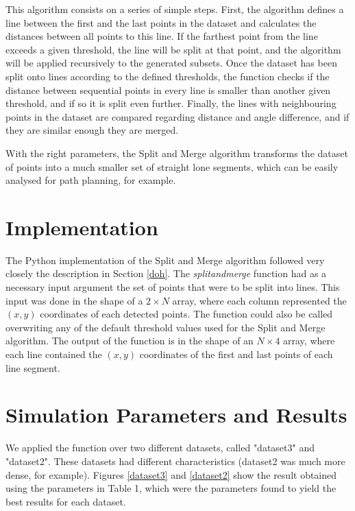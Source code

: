 \documentclass[11pt,oneside,a4paper]{article}
\begin{document}
This algorithm consists on a series of simple steps. First, the algorithm defines a line between the first and the last points in the dataset and calculates the distances between all points to this line. If the farthest point from the line exceeds a given threshold, the line will be split at that point, and the algorithm will be applied recursively to the generated subsets. Once the dataset has been split onto lines according to the defined thresholds, the function checks if the distance between sequential points in every line is smaller than another given threshold, and if so it is split even further. Finally, the lines with neighbouring points in the dataset are compared regarding distance and angle difference, and if they are similar enough they are merged.

With the right parameters, the Split and Merge algorithm transforms the dataset of points into a much smaller set of straight lone segments, which can be easily analysed for path planning, for example.

\section{Implementation}

The Python implementation of the Split and Merge algorithm followed very closely the description in Section \ref{doh}. The \textit{splitandmerge} function had as a necessary input argument the set of points that were to be split into lines. This input was done in the shape of a $2\times N$ array, where each column represented the $(x, y)$ coordinates of each detected points. The function could also be called overwriting any of the default threshold values used for the Split and Merge algorithm. The output of the function is in the shape of an $N\times 4$ array, where each line contained the $(x, y)$ coordinates of the first and last points of each line segment.


\section{Simulation Parameters and Results}

We applied the function over two different datasets, called "dataset3" and "dataset2". These datasets had different characteristics (dataset2 was much more dense, for example). Figures \ref{dataset3} and \ref{dataset2} show the result obtained using the parameters in Table 1, which were the parameters found to yield the best results for each dataset.
\end{document}
